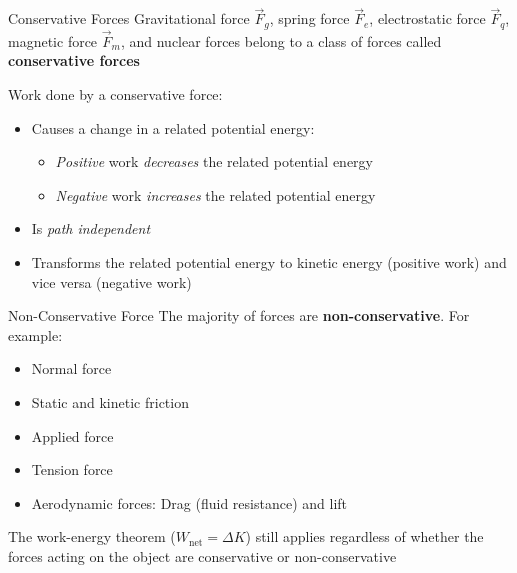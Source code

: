 \documentclass[12pt,compress,aspectratio=169]{beamer}
\begin{document}
\begin{frame}{Conservative Forces}
  Gravitational force $\vec F_g$, spring force $\vec F_e$, electrostatic force
  $\vec F_q$, magnetic force $\vec F_m$, and nuclear forces belong to a class of
  forces called \textbf{conservative forces}
    

  \vspace{-.15in}Work done by a conservative force:
  \begin{itemize}
  \item Causes a change in a related potential energy:
    \begin{itemize}
    \item \emph{Positive} work \emph{decreases} the related potential energy
    \item \emph{Negative} work \emph{increases} the related potential energy
    \end{itemize}
  \item Is \emph{path independent}
  \item Transforms the related potential energy to kinetic energy (positive
    work) and vice versa (negative work)
  \end{itemize}
\end{frame}




%  
%  
%



\begin{frame}{Non-Conservative Force}
  The majority of forces are \textbf{non-conservative}. For example:
  \begin{itemize}
  \item Normal force
  \item Static and kinetic friction
  \item Applied force
  \item Tension force
  \item Aerodynamic forces: Drag (fluid resistance) and lift
  \end{itemize}
  The work-energy theorem ($W_\text{net}=\Delta K$) still applies regardless of
  whether the forces acting on the object are conservative or non-conservative
\end{frame}
\end{document}
